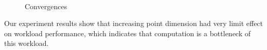 \begin{figure}[t!]
  \begin{center}
  ~
   \caption{Convergences}
   \label{fig:converge}
  \end{center}
\end{figure}



Our experiment results show that increasing point dimension had very limit effect on workload performance, which indicates that computation is a bottleneck of this workload.

